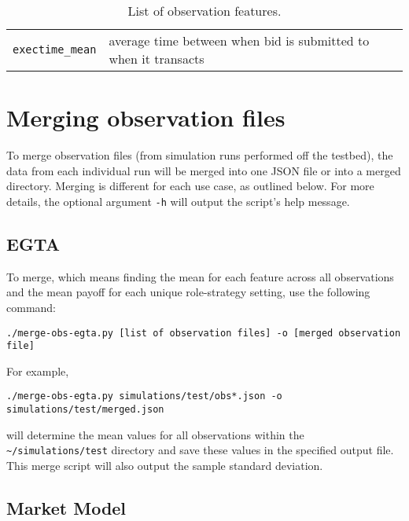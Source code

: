 \documentclass[11pt]{article}
\begin{document}
\begin{table}
\begin{tabular}[f]{p{} p{}}
\verb|exectime_mean|  & average time between when bid is submitted to when it transacts \\

\end{tabular}
\caption{List of observation features.}
\label{tab:obs}
\end{table}


\section{Merging observation files}

To merge observation files (from simulation runs performed off the testbed), the data from each individual run will be merged into one JSON file or into a merged directory.
%
Merging is different for each use case, as outlined below. For more details, the optional argument \verb|-h| will output the script's help message.


\subsection{EGTA}
To merge, which means finding the mean for each feature across all observations and the mean payoff for each unique role-strategy setting, use the following command:
\begin{verbatim}
./merge-obs-egta.py [list of observation files] -o [merged observation file]
\end{verbatim}
For example,
\begin{verbatim}
./merge-obs-egta.py simulations/test/obs*.json -o simulations/test/merged.json
\end{verbatim}
will determine the mean values for all observations within the \verb|~/simulations/test| directory and save these values in the specified output file.
This merge script will also output the sample standard deviation.

\subsection{Market Model}
\end{document}
